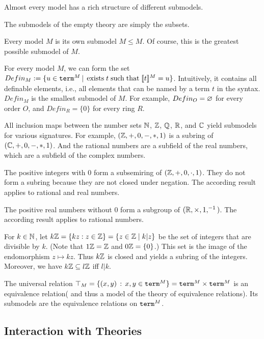 \begin{example}[Submodels]
Almost every model has a rich structure of different submodels.
\begin{compactitem}
\item The submodels of the empty theory are simply the subsets.
\item Every model $M$ is its own submodel $M\leq M$.
Of course, this is the greatest possible submodel of $M$.
\item For every model $M$, we can form the set $Defin_M := \{u\in \mathtt{term}^M\,|\,\;\mathrm{exists}\; t \;\mathrm{such}\;\mathrm{that}\; \llbracket t\rrbracket^{M}=u\}$.
Intuitively, it contains all definable elements, i.e., all elements that can be named by a term $t$ in the syntax.
$Defin_M$ is the smallest submodel of $M$.
For example, $Defin_O=\varnothing$ for every order $O$, and $Defin_R=\{0\}$ for every ring $R$.
\item All inclusion maps between the number sets $\mathbb{N}$, $\mathbb{Z}$, $\mathbb{Q}$, $\mathbb{R}$, and $\mathbb{C}$ yield submodels for various signatures.
For example, $(\mathbb{Z},+,0,-,*,1)$ is a subring of $(\mathbb{C},+,0,-,*,1)$.
And the rational numbers are a subfield of the real numbers, which are a subfield of the complex numbers.
\item The positive integers with $0$ form a subsemiring of $(\mathbb{Z},+,0,\cdot,1)$.
They do not form a subring because they are not closed under negation.
The according result applies to rational and real numbers.
\item The positive real numbers without $0$ form a subgroup of $(\mathbb{R},\times,1,^{-1})$.
The according result applies to rational numbers.
\item For $k\in\mathbb{N}$, let $k\mathbb{Z}=\{kz : z\in\mathbb{Z}\} = \{z\in\mathbb{Z}\;|\;k|z\}$ be the set of integers that are divisible by $k$.
(Note that $1\mathbb{Z}=\mathbb{Z}$ and $0\mathbb{Z}=\{0\}$.)
This set is the image of the endomorphism $z\mapsto kz$.
Thus $k\mathbb{Z}$ is closed and yields a subring of the integers.
Moreover, we have $k\mathbb{Z}\subseteq l\mathbb{Z}$ iff $l|k$.
\item The universal relation $\top_M=\{(x,y)\,:\,x,y\in\mathtt{term}^M\}=\mathtt{term}^M\times\mathtt{term}^M$ is an equivalence relation( and thus a model of the theory of equivalence relations).
Its submodels are the equivalence relations on $\mathtt{term}^M$.
\end{compactitem}
\end{example}

\subsection{Interaction with Theories}

